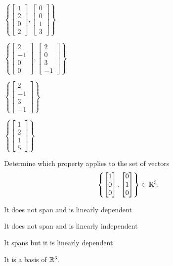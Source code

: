 \begin{readinessAssuranceTest}
\begin{multicols}{4}
\begin{readinessAssuranceTestChoices}
\item $\left\{ \begin{bmatrix} 1 \\ 2 \\ 0 \\ 2 \end{bmatrix}, \begin{bmatrix} 0 \\ 0 \\ 1 \\ 3 \end{bmatrix} \right\}$
\item $\left\{ \begin{bmatrix} 2 \\ -1 \\ 0 \\ 0 \end{bmatrix}, \begin{bmatrix} 2 \\ 0 \\ 3 \\ -1 \end{bmatrix} \right\}$
\item $\left\{ \begin{bmatrix} 2 \\ -1 \\ 3 \\ -1 \end{bmatrix} \right\}$
\item $\left\{ \begin{bmatrix} 1 \\ 2 \\ 1 \\ 5 \end{bmatrix} \right\}$
\end{readinessAssuranceTestChoices}
\end{multicols}


\item Determine which property applies to the set of vectors $$\left\{ \begin{bmatrix}  1 \\ 0 \\ 0 \end{bmatrix}, \begin{bmatrix} 0 \\ 1 \\ 0 \end{bmatrix} \right\} \subset \mathbb{R}^3.$$
\begin{readinessAssuranceTestChoices}
\item It does not span and is linearly dependent
\item It does not span and is linearly independent %
\item It spans but it is linearly dependent
\item It is a basis of $\mathbb{R}^3$.
\end{readinessAssuranceTestChoices}



\end{readinessAssuranceTest}
